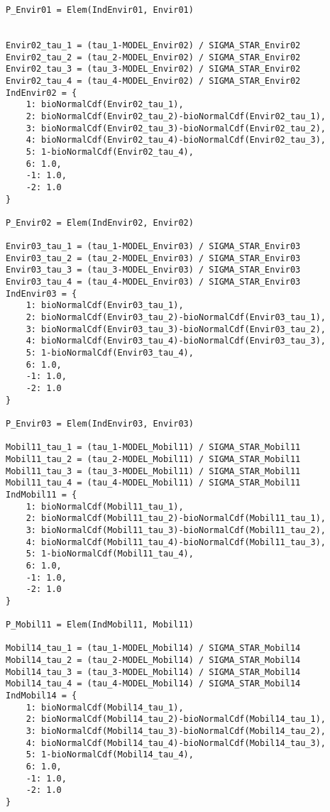 \documentclass[12pt,a4paper]{article}
\begin{document}
\begin{lstlisting}[style=numbers]
P_Envir01 = Elem(IndEnvir01, Envir01)


Envir02_tau_1 = (tau_1-MODEL_Envir02) / SIGMA_STAR_Envir02
Envir02_tau_2 = (tau_2-MODEL_Envir02) / SIGMA_STAR_Envir02
Envir02_tau_3 = (tau_3-MODEL_Envir02) / SIGMA_STAR_Envir02
Envir02_tau_4 = (tau_4-MODEL_Envir02) / SIGMA_STAR_Envir02
IndEnvir02 = {
    1: bioNormalCdf(Envir02_tau_1),
    2: bioNormalCdf(Envir02_tau_2)-bioNormalCdf(Envir02_tau_1),
    3: bioNormalCdf(Envir02_tau_3)-bioNormalCdf(Envir02_tau_2),
    4: bioNormalCdf(Envir02_tau_4)-bioNormalCdf(Envir02_tau_3),
    5: 1-bioNormalCdf(Envir02_tau_4),
    6: 1.0,
    -1: 1.0,
    -2: 1.0
}

P_Envir02 = Elem(IndEnvir02, Envir02)

Envir03_tau_1 = (tau_1-MODEL_Envir03) / SIGMA_STAR_Envir03
Envir03_tau_2 = (tau_2-MODEL_Envir03) / SIGMA_STAR_Envir03
Envir03_tau_3 = (tau_3-MODEL_Envir03) / SIGMA_STAR_Envir03
Envir03_tau_4 = (tau_4-MODEL_Envir03) / SIGMA_STAR_Envir03
IndEnvir03 = {
    1: bioNormalCdf(Envir03_tau_1),
    2: bioNormalCdf(Envir03_tau_2)-bioNormalCdf(Envir03_tau_1),
    3: bioNormalCdf(Envir03_tau_3)-bioNormalCdf(Envir03_tau_2),
    4: bioNormalCdf(Envir03_tau_4)-bioNormalCdf(Envir03_tau_3),
    5: 1-bioNormalCdf(Envir03_tau_4),
    6: 1.0,
    -1: 1.0,
    -2: 1.0
}

P_Envir03 = Elem(IndEnvir03, Envir03)

Mobil11_tau_1 = (tau_1-MODEL_Mobil11) / SIGMA_STAR_Mobil11
Mobil11_tau_2 = (tau_2-MODEL_Mobil11) / SIGMA_STAR_Mobil11
Mobil11_tau_3 = (tau_3-MODEL_Mobil11) / SIGMA_STAR_Mobil11
Mobil11_tau_4 = (tau_4-MODEL_Mobil11) / SIGMA_STAR_Mobil11
IndMobil11 = {
    1: bioNormalCdf(Mobil11_tau_1),
    2: bioNormalCdf(Mobil11_tau_2)-bioNormalCdf(Mobil11_tau_1),
    3: bioNormalCdf(Mobil11_tau_3)-bioNormalCdf(Mobil11_tau_2),
    4: bioNormalCdf(Mobil11_tau_4)-bioNormalCdf(Mobil11_tau_3),
    5: 1-bioNormalCdf(Mobil11_tau_4),
    6: 1.0,
    -1: 1.0,
    -2: 1.0
}

P_Mobil11 = Elem(IndMobil11, Mobil11)

Mobil14_tau_1 = (tau_1-MODEL_Mobil14) / SIGMA_STAR_Mobil14
Mobil14_tau_2 = (tau_2-MODEL_Mobil14) / SIGMA_STAR_Mobil14
Mobil14_tau_3 = (tau_3-MODEL_Mobil14) / SIGMA_STAR_Mobil14
Mobil14_tau_4 = (tau_4-MODEL_Mobil14) / SIGMA_STAR_Mobil14
IndMobil14 = {
    1: bioNormalCdf(Mobil14_tau_1),
    2: bioNormalCdf(Mobil14_tau_2)-bioNormalCdf(Mobil14_tau_1),
    3: bioNormalCdf(Mobil14_tau_3)-bioNormalCdf(Mobil14_tau_2),
    4: bioNormalCdf(Mobil14_tau_4)-bioNormalCdf(Mobil14_tau_3),
    5: 1-bioNormalCdf(Mobil14_tau_4),
    6: 1.0,
    -1: 1.0,
    -2: 1.0
}


\end{lstlisting}
\end{document}
